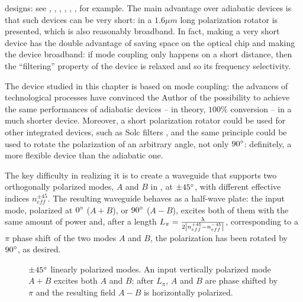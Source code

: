\begin{description}
  designs: see \cite{huang_realization}, \cite{tzolov_passive}, \cite{lui_polarization},
  \cite{kotlyar_compact}, \cite{correia_genetic},
  \cite{elrefaei_slanted}, for example. The main advantage over
  adiabatic devices is that such devices can be very short: in
  \cite{kotlyar_compact} a $1.6 \mu m$ long polarization rotator is
  presented, which is also reasonably broadband. In fact, making a
  very short device has the double advantage of saving space on the
  optical chip and making the device broadband: if mode coupling only
  happens on a short distance, then the ``filtering'' property of the
  device is relaxed and so its frequency selectivity.
\end{description}

The device studied in this chapter is based on mode coupling: the
advances of technological processes have convinced the Author of the
possibility to achieve the same performances of adiabatic devices --
in theory, $100\%$ conversion -- in a much shorter device. Moreover, a
short polarization rotator could be used for other integrated devices,
such as Solc filters \cite{solc_birefringent}, and the same principle
could be used to rotate the polarization of an arbitrary angle, not
only $90^\circ$: definitely, a more flexible device than the
adiabatic one.

The key difficulty in realizing it is to create a waveguide that
supports two orthogonally polarized modes, $A$ and $B$ in
, at $\pm 45^\circ$, with different
effective indices $n_{eff}^{\pm 45}$. The resulting waveguide behaves
as a half-wave plate: the input mode, polarized at $0^\circ$ ($A+B$),
or $90^\circ$ ($A - B$), excites both of them with the same amount
of power and, after a length $L_\pi =
\frac{\lambda}{2{\left\lvert n_{eff}^{+45} - n_{eff}^{-45}\right\rvert}}$, corresponding
to a $\pi$ phase shift of the two modes $A$ and $B$, the polarization
has been rotated by $90^\circ$, as desired.

\begin{figure}[htbp]
  \begin{center}
    \resizebox{5cm}{!}{}
  \end{center}
  \caption{$\pm45^\circ$ linearly polarized modes. An input
    vertically polarized mode $A+B$ excites both $A$ and $B$: after
    $L_\pi$, $A$ and $B$ are phase shifted by $\pi$ and the resulting
    field $A - B$ is horizontally polarized.}
  \label{fig:polrot_modes}
\end{figure}

